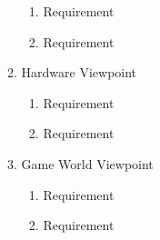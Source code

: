 \documentclass[]{article}
\begin{document}
\begin{enumerate}[{BE}1.]
\begin{enumerate}[{VP4}.1]
			\begin{enumerate}
				\item Requirement
				\item Requirement
			\end{enumerate}
		\item Hardware Viewpoint
			\begin{enumerate}
				\item Requirement
				\item Requirement
			\end{enumerate}
		\item Game World Viewpoint
			\begin{enumerate}
				\item Requirement
				\item Requirement
			\end{enumerate}
			

\end{enumerate}
\end{enumerate}
\end{document}
